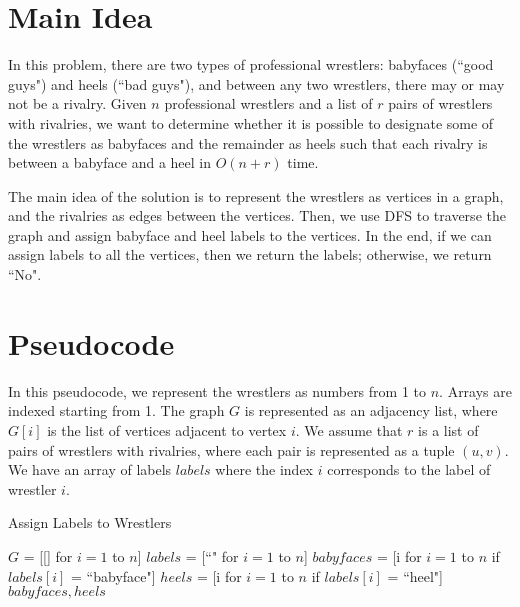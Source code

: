 \documentclass{article}
\begin{document}
\section{Main Idea}

In this problem, there are two types of professional wrestlers: babyfaces (``good guys") and heels (``bad guys"), and between any two wrestlers, there may or may not be a rivalry.
Given $n$ professional wrestlers and a list of $r$ pairs of wrestlers with rivalries, we want to determine whether it is possible to designate some of the wrestlers as babyfaces and the remainder as heels such that each rivalry is between a babyface and a heel in $O(n+r)$ time.

The main idea of the solution is to represent the wrestlers as vertices in a graph, and the rivalries as edges between the vertices.
Then, we use DFS to traverse the graph and assign babyface and heel labels to the vertices.
In the end, if we can assign labels to all the vertices, then we return the labels; otherwise, we return ``No".

\section{Pseudocode}

In this pseudocode, we represent the wrestlers as numbers from 1 to $n$.
Arrays are indexed starting from 1.
The graph $G$ is represented as an adjacency list, where $G[i]$ is the list of vertices adjacent to vertex $i$.
We assume that $r$ is a list of pairs of wrestlers with rivalries, where each pair is represented as a tuple $(u, v)$.
We have an array of labels $labels$ where the index $i$ corresponds to the label of wrestler $i$.

\vspace{1em}

\begin{algorithm}[H]
\caption{Assign Labels to Wrestlers}
\BlankLine
$G$ = [[] for $i = 1$ to $n$] 
$labels$ = [``" for $i = 1$ to $n$] 
$babyfaces$ = [i for $i = 1$ to $n$ if $labels[i]$ = ``babyface"]\;
$heels$ = [i for $i = 1$ to $n$ if $labels[i]$ = ``heel"]\;
\Return $babyfaces, heels$\;
\end{algorithm}
\end{document}
